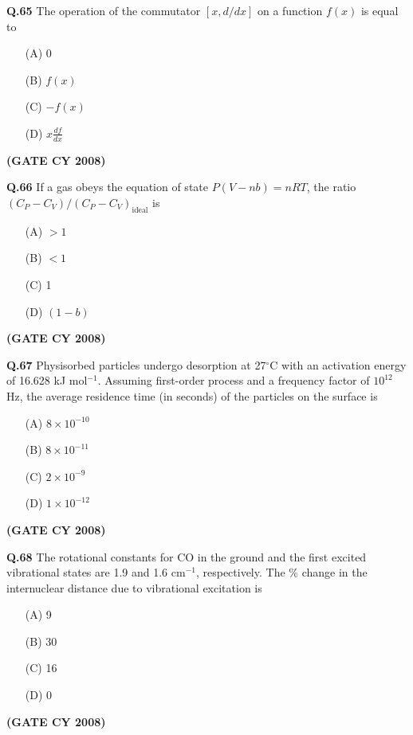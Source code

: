 \documentclass[12pt]{article}
\begin{document}
\begin{enumerate}
\vspace{0.5cm}

\textbf{Q.65} The operation of the commutator $[x, d/dx]$ on a function $f(x)$ is equal to

\begin{enumerate}
\item[(A)] 0
\item[(B)] $f(x)$
\item[(C)] $-f(x)$
\item[(D)] $x \frac{df}{dx}$
\end{enumerate}   \textbf{(GATE CY 2008)}


\vspace{0.5cm}

\textbf{Q.66} If a gas obeys the equation of state $P (V - nb) = nRT$, the ratio $(C_P - C_V)/(C_P - C_V)_{\text{ideal}}$ is

\begin{enumerate}
\item[(A)] $> 1$
\item[(B)] $< 1$
\item[(C)] 1
\item[(D)] $(1 - b)$
\end{enumerate}   \textbf{(GATE CY 2008)}


\vspace{0.5cm}

\textbf{Q.67} Physisorbed particles undergo desorption at 27$^\circ$C with an activation energy of 16.628 kJ mol$^{-1}$. Assuming first-order process and a frequency factor of $10^{12}$ Hz, the average residence time (in seconds) of the particles on the surface is

\begin{enumerate}
\item[(A)] $8 \times 10^{-10}$
\item[(B)] $8 \times 10^{-11}$
\item[(C)] $2 \times 10^{-9}$
\item[(D)] $1 \times 10^{-12}$
\end{enumerate}   \textbf{(GATE CY 2008)}


\vspace{0.5cm}

\textbf{Q.68} The rotational constants for CO in the ground and the first excited vibrational states are 1.9 and 1.6 cm$^{-1}$, respectively. The \% change in the internuclear distance due to vibrational excitation is

\begin{enumerate}
\item[(A)] 9
\item[(B)] 30
\item[(C)] 16
\item[(D)] 0
\end{enumerate}   \textbf{(GATE CY 2008)}



\end{enumerate}
\end{document}
